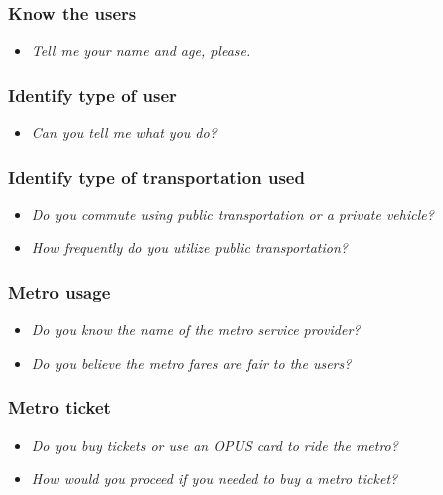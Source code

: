 \documentclass[a4paper,12pt]{article}
\begin{document}
\subsubsection{Know the users}
\begin{itemize}[noitemsep]
    \item \emph{Tell me your name and age, please.}
\end{itemize}

\subsubsection{Identify type of user}
\begin{itemize}[noitemsep]
    \item \emph{Can you tell me what you do?}
\end{itemize}

\subsubsection{Identify type of transportation used}
\begin{itemize}[noitemsep]
    \item \emph{Do you commute using public transportation or a private vehicle?}
    \item \emph{How frequently do you utilize public transportation?}
\end{itemize}

\subsubsection{Metro usage}
\begin{itemize}[noitemsep]
    \item \emph{Do you know the name of the metro service provider?}
    \item \emph{Do you believe the metro fares are fair to the users?}
\end{itemize}

\subsubsection{Metro ticket}
\begin{itemize}[noitemsep]
    \item \emph{Do you buy tickets or use an OPUS card to ride the metro?}
    \item \emph{How would you proceed if you needed to buy a metro ticket?}
\end{itemize}
\end{document}
